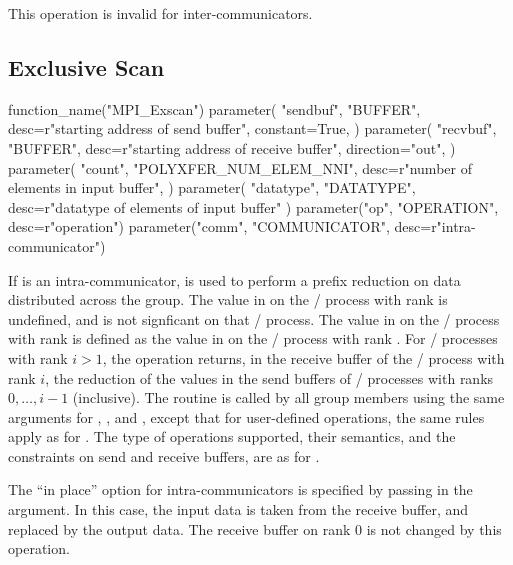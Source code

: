 This operation is invalid for inter-communicators.

\subsection{Exclusive Scan}
\label{subsec:coll-exscan}
\label{coll-exscan} %

%
\begin{mpi-binding}
    function_name("MPI_Exscan")
    parameter(
        "sendbuf",
        "BUFFER",
        desc=r"starting address of send buffer",
        constant=True,
    )
    parameter(
        "recvbuf",
        "BUFFER",
        desc=r"starting address of receive buffer",
        direction="out",
    )
    parameter(
        "count",
        "POLYXFER_NUM_ELEM_NNI",
        desc=r"number of elements in input buffer",
    )
    parameter(
        "datatype", "DATATYPE", desc=r"datatype of elements of input buffer"
    )
    parameter("op", "OPERATION", desc=r"operation")
    parameter("comm", "COMMUNICATOR", desc=r"intra-communicator")
\end{mpi-binding}

If  is an intra-communicator,
 is used to perform a prefix reduction on data distributed
across the group.
The value in  on the \MPI/ process with rank  is undefined, and  is not signficant on that \MPI/ process.
The value in  on the \MPI/ process with rank  is defined as
the value in  on the \MPI/ process with rank .
For \MPI/ processes with rank $ i > 1 $, the operation returns, in the
receive buffer of the
\MPI/ process with rank $i$, the reduction of the values in the send buffers
of \MPI/ processes with ranks $0,\ldots,i-1$ (inclusive).
The routine is called by all group members using
the same arguments for , , 
and , except that for
user-defined operations, the same rules apply as for
. The type of operations supported, their semantics,
and the constraints on send and receive buffers, are as for
.

The ``in place'' option for intra-communicators is specified by passing  in the  argument.
In this case, the input data is taken from the receive buffer, and replaced by the output data.
The receive buffer on rank 0 is not changed by this operation.

